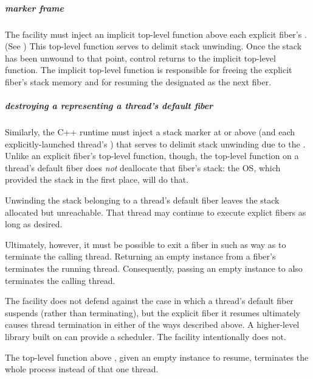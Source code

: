 \subparagraph{marker frame}

The \fiber facility must inject an implicit top-level function above
each explicit fiber's \entryfn. (See ) This
top-level function serves to delimit stack unwinding. Once the stack has been
unwound to that point, control returns to the implicit top-level function. The
implicit top-level function is responsible for freeing the explicit fiber's
stack memory and for resuming the \fiber designated as the next fiber.

\subparagraph{destroying a \fiber representing a thread's default fiber}

Similarly, the C++ runtime must inject a stack marker at or above \main (and
each explicitly-launched thread's \entryfn) that serves to delimit stack
unwinding due to the \foreignex. Unlike an explicit fiber's top-level
function, though, the top-level function on a thread's default fiber
does \emph{not} deallocate that fiber's stack: the OS, which provided the
stack in the first place, will do that.

Unwinding the stack belonging to a thread's default fiber leaves the stack
allocated but unreachable. That thread may continue to execute explict fibers
as long as desired.

Ultimately, however, it must be possible to exit a fiber in such as way as to
terminate the calling thread. Returning an empty \fiber instance from
a fiber's \entryfn terminates the running thread. Consequently, passing an
empty \fiber instance to \unwindfib also terminates the calling thread.

The \fiber facility does not defend against the case in which a thread's
default fiber suspends (rather than terminating), but the explicit fiber it
resumes ultimately causes thread termination in either of the ways described
above. A higher-level library built on \fiber can provide a scheduler.
The \fiber facility intentionally does not.

The top-level function above \main, given an empty \fiber instance to resume,
terminates the whole process instead of that one thread.
